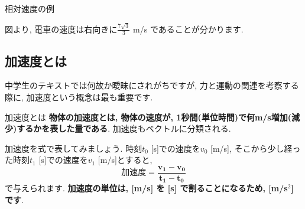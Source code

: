 \documentclass[11pt,dvipdfmx]{jsarticle}
\numberwithin{equation}{section} %
\begin{document}
\begin{exbox}{相対速度の例}
\begin{itemize}
\begin{center}
        \end{center}
        図より, 電車の速度は右向きに$\frac{7\sqrt{3}}{3}$ m/s であることが分かります. 
    \end{itemize}
\end{exbox}
\subsection{加速度とは}\label{加速度とは}
中学生のテキストでは何故か曖昧にされがちですが, 力と運動の関連を考察する際に, 加速度という概念は最も重要です. 
\begin{freebox}{加速度とは}
    \textbf{物体の加速度とは, 物体の速度が, 1秒間(単位時間)で何m/s増加(減少)するかを表した量である}. 加速度もベクトルに分類される.
\end{freebox}
加速度を式で表してみましょう. 時刻$t_{0}$ [s]での速度を$v_{0}$ [m/s], そこから少し経った時刻$t_{1}$ [s]での速度を$v_{1}$ [m/s]とすると,
\begin{equation}
    \textbf{加速度} = \frac{\bm{v_{1}} - \bm{v_{0}}}{\bm{t_{1}} - \bm{t_{0}}} \label{加速度}
\end{equation}
で与えられます. \textbf{加速度の単位は,  [m/s] を [s] で割ることになるため, [m/s$^2$] です}. 
\end{document}
